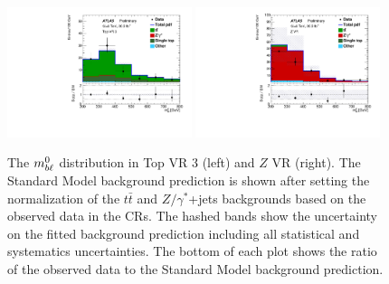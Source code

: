\begin{figure}
  \centering
  \includegraphics[width=0.48\textwidth]{figs/blstop/vr_top_3_mbl_0.pdf}
  \includegraphics[width=0.48\textwidth]{figs/blstop/vr_Z_mbl_0.pdf}
  \caption{The $m_{b\ell}^0$ distribution in Top VR 3 (left)
    and $Z$ VR (right). The Standard Model background prediction is shown
    after setting the normalization of the $t\bar{t}$ and $Z/\gamma^{*}$+jets
    backgrounds based on the observed data in the CRs. The hashed bands show
    the uncertainty on the fitted background prediction including
    all statistical and systematics uncertainties.
    The bottom of each plot shows the ratio of the observed data to the
    Standard Model background prediction.
  }
  \label{fig:mbl_vr}
\end{figure}

